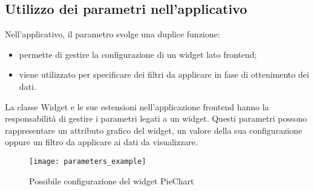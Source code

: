 \subsection{Utilizzo dei parametri nell'applicativo}
Nell'applicativo, il parametro svolge una duplice funzione:
\begin{itemize}
\item permette di gestire la configurazione di un widget lato frontend;
\item viene utilizzato per specificare dei filtri da applicare in fase di ottenimento dei dati.
\end{itemize}
La classe Widget e le sue estensioni nell'applicazione frontend hanno la responsabilità di gestire i parametri legati a un widget. Questi parametri possono rappresentare un attributo grafico del widget, un valore della sua configurazione oppure un filtro da applicare ai dati da visualizzare.
\begin{figure}[h!]
\begin{center}
\texttt{[image: parameters\_example]}\\
\caption{Possibile configurazione del widget PieChart}
\end{center}
\end{figure}
